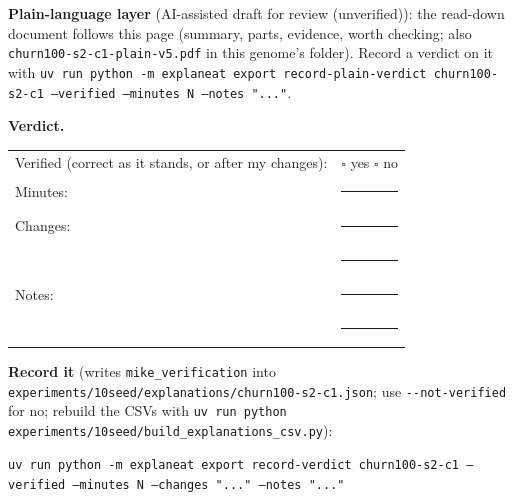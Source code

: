 \documentclass[a4paper,11pt]{article}
\begin{document}
\textbf{Plain-language layer} (AI-assisted draft for review (unverified)): the read-down document follows this page (summary, parts, evidence, worth checking; also \texttt{churn100-s2-c1-plain-v5.pdf} in this genome's folder). Record a verdict on it with \texttt{uv run python -m explaneat export record-plain-verdict churn100-s2-c1 --verified --minutes N --notes "..."}.

\textbf{Verdict.}

\begin{tabularx}{\linewidth}{@{}lX@{}}
Verified (correct as it stands, or after my changes): & $\square$ yes \quad $\square$ no \\[4pt]
Minutes: & \rule{3cm}{0.4pt} \\[4pt]
Changes: & \rule{\linewidth}{0.4pt} \\[10pt]
 & \rule{\linewidth}{0.4pt} \\[4pt]
Notes: & \rule{\linewidth}{0.4pt} \\[10pt]
 & \rule{\linewidth}{0.4pt} \\
\end{tabularx}

\textbf{Record it} (writes \texttt{mike\_verification} into \texttt{experiments/10seed/explanations/churn100-s2-c1.json}; use \texttt{-{}-not-verified} for no; rebuild the CSVs with \texttt{uv run python experiments/10seed/build\_explanations\_csv.py}):

{\footnotesize\raggedright\texttt{uv run python -m explaneat export record-verdict churn100-s2-c1 --verified --minutes N --changes "..." --notes "..."}\par}
\end{document}
